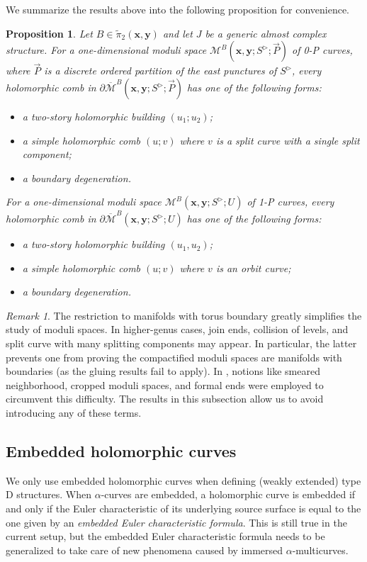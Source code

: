 \documentclass{amsart}
\newtheorem{prop}[thm]{Proposition}
\theoremstyle{definition}
\theoremstyle{remark}
\newtheorem{rmk}[thm]{Remark}
\numberwithin{equation}{section}
\numberwithin{equation}{section} \makeatletter
\begin{document}
We summarize the results above into the following proposition for convenience.
\begin{prop}\label{Proposition, summary of degeneration of moduli spaces}
Let $B\in \tilde{\pi}_2(\bm{x},\bm{y})$ and let $J$ be a generic almost complex structure. For a one-dimensional moduli space $\mathcal{M}^{B}(\bm{x},\bm{y};S^{\triangleright};\overrightarrow{P})$ of 0-P curves, where $\overrightarrow{P}$ is a discrete ordered partition of the east punctures of $S^\triangleright$, every holomorphic comb in $\partial\overline{\mathcal{M}}^{B}(\bm{x},\bm{y};S^{\triangleright};\overrightarrow{P})$ has one of the following forms:
\begin{itemize}
\item[(1)]a two-story holomorphic building $(u_1; u_2)$;
\item[(2)]a simple holomorphic comb $(u; v)$ where $v$ is a split curve with a single split component; 
\item[(3)]a boundary degeneration.
\end{itemize}

For a one-dimensional moduli space $\mathcal{M}^{B}(\bm{x},\bm{y};S^{\triangleright};U)$ of 1-P curves, every holomorphic comb in $\partial\overline{\mathcal{M}}^{B}(\bm{x},\bm{y};S^{\triangleright};U)$ has one of the following forms:
\begin{itemize}
\item[(1)]a two-story holomorphic building $(u_1,u_2)$;
\item[(2)]a simple holomorphic comb $(u; v)$ where $v$ is an orbit curve;
\item[(3)]a boundary degeneration.
\end{itemize}
\end{prop}

\begin{rmk}
The restriction to manifolds with torus boundary greatly simplifies the study of moduli spaces. In higher-genus cases, join ends, collision of levels, and split curve with many splitting components may appear. In particular, the latter prevents one from proving the compactified moduli spaces are manifolds with boundaries (as the gluing results fail to apply). In \cite{LOT18}, notions like smeared neighborhood, cropped moduli spaces, and formal ends were employed to circumvent this difficulty. The results in this subsection allow us to avoid introducing any of these terms. 
\end{rmk}
\subsection{Embedded holomorphic curves}\label{Section, embedded index formula}
We only use embedded holomorphic curves when defining (weakly extended) type D structures. When $\alpha$-curves are embedded, a holomorphic curve is embedded if and only if the Euler characteristic of its underlying source surface is equal to the one given by an \emph{embedded Euler characteristic formula}. This is still true in the current setup, but the embedded Euler characteristic formula needs to be generalized to take care of new phenomena caused by immersed $\alpha$-multicurves. 
\end{document}
